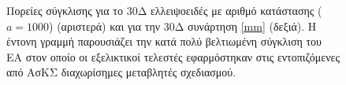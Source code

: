 \begin{figure}[h!]
\begin{minipage}[b]{0.5\linewidth}
 \centering
\end{minipage}
\begin{minipage}[b]{0.5\linewidth}
 \centering
\end{minipage}
\caption{Πορείες σύγκλισης για το 30Δ ελλειψοειδές με αριθμό κατάστασης ($a\!=\!1000$) (αριστερά)  και για την 30Δ συνάρτηση \ref{mm} (δεξιά). Η έντονη γραμμή παρουσιάζει την κατά πολύ βελτιωμένη σύγκλιση του ΕΑ στον οποίο οι εξελικτικοί τελεστές εφαρμόστηκαν στις εντοπιζόμενες από ΑσΚΣ διαχωρίσημες μεταβλητές σχεδιασμού.} 
\label{ellipse_t2_pca}
\end{figure} 

